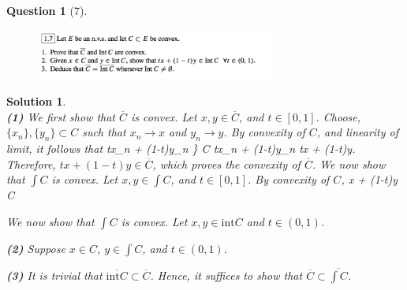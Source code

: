 \documentclass{article} %
\def\eQb#1\eQe{\begin{eqnarray*}#1\end{eqnarray*}}
\theoremstyle{quest}
\newtheorem*{question}{Question}
\newtheorem*{solution}{Solution}
\begin{document}
\newpage

\begin{question}[7]
\hfill
\begin{figure}[h!]
  \centering
    \includegraphics[width=0.7\textwidth]{funcA-1-7.png}
\end{figure}
\end{question}
\begin{solution} \hfill \\
\textbf{(1)}
We first show that $\overline{C}$ is convex. Let $x,y \in \overline{C}$, and
$t \in [0,1]$. Choose, $\{x_n\}, \{y_n\} \subset C$ such that $x_n \to x$ and
$y_n \to y$. By convexity of $C$, and linearity of limit, it follows that 
\eQb
\{ tx_n + (1-t)y_n \} \subset C \>\>  \>\> 
tx_n + (1-t)y_n \to tx + (1-t)y.
\eQe
Therefore, $tx + (1-t)y \in \overline{C}$, 
which proves the convexity of $\overline{C}$. We now show that $\int C$ is
convex. Let $x,y \in \int {C}$, and $t \in [0,1]$. By convexity of $C$, 
\eQb
tx + (1-t)y \in C 
\eQe 


\bigskip
We now show that $\int C$ is convex. Let $x,y \in \text{int}{C}$ and $t \in (0,1)$. 



\textbf{(2)} Suppose $x \in C$, $y \in \int C$, and $t \in (0,1)$.  

\bigskip

\textbf{(3)} It is trivial that $\overline{\text{int} C} \subset \overline{C}$. Hence,
it suffices to show that $\overline{C} \subset \overline{\int C}$. 


\end{solution}

\newpage
\end{document}
